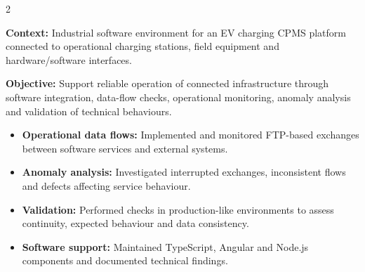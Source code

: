 \documentclass[8pt,a4paper,ragged2e,withhyper]{altacv}
\begin{document}



\makecvheader
\vspace{-0.3cm}


\begin{paracol}{2}



\textbf{Context:} Industrial software environment for an EV charging CPMS platform connected to operational charging stations, field equipment and hardware/software interfaces.

\textbf{Objective:} Support reliable operation of connected infrastructure through software integration, data-flow checks, operational monitoring, anomaly analysis and validation of technical behaviours.

\begin{itemize}
  \item \textbf{Operational data flows:} Implemented and monitored FTP-based exchanges between software services and external systems.
  \item \textbf{Anomaly analysis:} Investigated interrupted exchanges, inconsistent flows and defects affecting service behaviour.
  \item \textbf{Validation:} Performed checks in production-like environments to assess continuity, expected behaviour and data consistency.
  \item \textbf{Software support:} Maintained TypeScript, Angular and Node.js components and documented technical findings.
\end{itemize}

\divider



\end{paracol}
\end{document}

